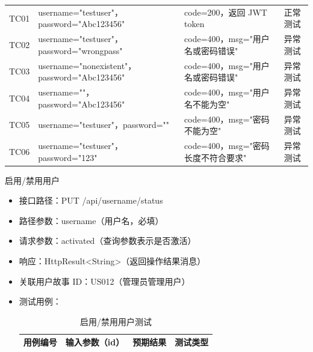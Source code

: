 \begin{levellist}
\begin{levellist}
\begin{itemize}
\begin{longtable}{>{\centering\arraybackslash}m{2cm} >{\centering\arraybackslash}m{4cm} >{\centering\arraybackslash}m{5cm} >{\centering\arraybackslash}m{2cm}}
                      \bottomrule
                      \endfoot

                      TC01          & username="testuser"，password="Abc123456"    & code=200，返回 JWT token    & 正常测试          \\
                      TC02          & username="testuser"，password="wrongpass"    & code=400，msg="用户名或密码错误"  & 异常测试          \\
                      TC03          & username="nonexistent"，password="Abc123456" & code=400，msg="用户名或密码错误"  & 异常测试          \\
                      TC04          & username=""，password="Abc123456"            & code=400，msg="用户名不能为空"   & 异常测试          \\
                      TC05          & username="testuser"，password=""             & code=400，msg="密码不能为空"    & 异常测试          \\
                      TC06          & username="testuser"，password="123"          & code=400，msg="密码长度不符合要求" & 异常测试          \\
                  \end{longtable}
        \end{itemize}

        \item 启用/禁用用户
        \begin{itemize}
            \item 接口路径：PUT /api/{username}/status
            \item 路径参数：username（用户名，必填）
            \item 请求参数：activated（查询参数表示是否激活）
            \item 响应：HttpResult<String>（返回操作结果消息）
            \item 关联用户故事 ID：US012（管理员管理用户）
            \item 测试用例：
                  \begin{longtable}{>{\centering\arraybackslash}m{1.7cm} >{\centering\arraybackslash}m{3.7cm} >{\centering\arraybackslash}m{6cm} >{\centering\arraybackslash}m{1.7cm}}

                      \caption{启用/禁用用户测试} \label{tab:training}                                 \\

                      \toprule
                      \textbf{用例编号} & \textbf{输入参数（id）} & \textbf{预期结果}        & \textbf{测试类型} \\
                      \midrule
                      \endfirsthead


\end{longtable}
\end{itemize}
\end{levellist}
\end{levellist}
